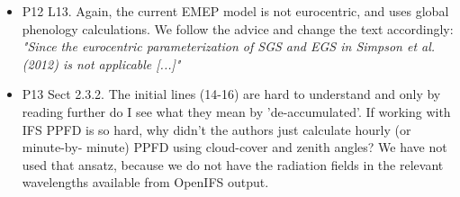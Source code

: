 \documentclass{scrartcl}
\begin{document}
\begin{itemize}
\item {\color{blue}P12 L13. Again, the current EMEP model is not eurocentric, and uses global
  phenology calculations.}
  We follow the advice and change the text accordingly: \emph{"Since the eurocentric parameterization of SGS and EGS in Simpson et al. (2012) is not applicable [...]"}
  
\item {\color{blue}P13 Sect 2.3.2. The initial lines (14-16) are hard to understand and only by
reading further do I see what they mean by ’de-accumulated’. If working with
IFS PPFD is so hard, why didn’t the authors just calculate hourly (or minute-by-
minute) PPFD using cloud-cover and zenith angles?}
We have not used that ansatz, because we do not have the radiation fields in the relevant wavelengths available from OpenIFS output.
\end{itemize}
\newpage
\end{document}

